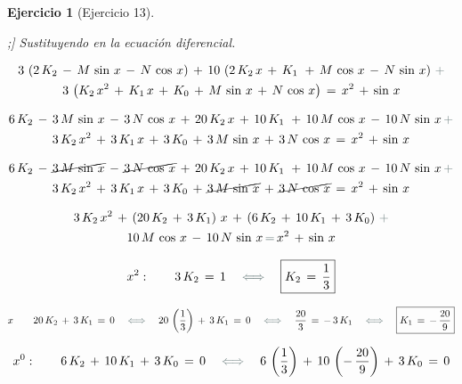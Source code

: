 \documentclass[a4paper,11pt, openany]{book}
\newtheorem{ejer}{Ejercicio}[section]
\newcommand*{\itembolasazules}[1]{%
\footnotesize\protect\tikz[baseline=-3pt]%
\protect\node[scale=.7, circle, shade, ball
color=green]{\color{white}\Large\bf#1};}
\begin{document}
\begin{ejer}[Ejercicio 13]
\begin{enumerate}[label=\itembolasazules{\arabic*}]
Sustituyendo en la ecuación diferencial.
 
\begin{multline*}
3\,\left(2\,K_{2}\,-\,M\,\sin\,x\,-\,N\,\cos\,x \right)\,+\,10\,\left(2\,K_{2}\,x\,+\,K_{1}\,\,+\,M\,\cos\,x\,-\,N\,\sin\,x \right)\,\textcolor{aurometalsaurus}{+} \\
3\,\left(K_{2}\,x^{2}\,+\,K_{1}\,x\,+\,K_{0}\,+\,M\,\sin\,x\,+\,N\,\cos\,x \right)\,=\,x^{2}\,+\,\sin\,x
\end{multline*}
 
\begin{multline*}
6\,K_{2}\,-\,3\,M\,\sin\,x\,-\,3\,N\,\cos\,x\,+\,20\,K_{2}\,x\,+\,10\,K_{1}\,\,+\,10\,M\,\cos\,x\,-\,10\,N\,\sin\,x\,\textcolor{aurometalsaurus}{+} \\
3\,K_{2}\,x^{2}\,+\,3\,K_{1}\,x\,+\,3\,K_{0}\,+\,3\,M\,\sin\,x\,+\,3\,N\,\cos\,x\,=\,x^{2}\,+\,\sin\,x
\end{multline*}
 
\begin{multline*}
6\,K_{2}\,-\,\cancel{3\,M\,\sin\,x}\,-\,\cancel{3\,N\,\cos\,x}\,+\,20\,K_{2}\,x\,+\,10\,K_{1}\,\,+\,10\,M\,\cos\,x\,-\,10\,N\,\sin\,x\,\textcolor{aurometalsaurus}{+} \\
3\,K_{2}\,x^{2}\,+\,3\,K_{1}\,x\,+\,3\,K_{0}\,+\,\cancel{3\,M\,\sin\,x}\,+\,\cancel{3\,N\,\cos\,x}\,=\,x^{2}\,+\,\sin\,x
\end{multline*}
 
 
\begin{multline*}
3\,K_{2}\,x^{2}\,+\,\left(20\,K_{2}\,+\,3\,K_{1} \right)\,x\,+\,\left(6\,K_{2}\,+\,10\,K_{1}\,+\,3\,K_{0} \right)\,\textcolor{aurometalsaurus}{+} \\   
10\,M\,\cos\,x\,-\,10\,N\,\sin\,x\,\textcolor{aurometalsaurus}{=}\,x^{2}\,+\,\sin\,x
\end{multline*}
 
$$x^{2}: \qquad 3\,K_{2}\,=\,1 \quad \textcolor{aurometalsaurus}{\iff} \quad \boxed{K_{2}\,=\,\dfrac{1}{3}}$$
 
$$x \qquad 20\,K_{2}\,+\,3\,K_{1}\,=\,0 \quad \textcolor{aurometalsaurus}{\iff} \quad 20\,\left(\dfrac{1}{3} \right)\,+\,3\,K_{1}\,=\,0 \quad \textcolor{aurometalsaurus}{\iff} \quad \dfrac{20}{3}\,=\,-\,3\,K_{1}\quad \textcolor{aurometalsaurus}{\iff} \quad \boxed{K_{1}\,=\,-\,\dfrac{20}{9} }$$
 
$$x^{0}: \qquad 6\,K_{2}\,+\,10\,K_{1}\,+\,3\,K_{0}\,=\,0 \quad \textcolor{aurometalsaurus}{\iff} \quad 6\,\left(\dfrac{1}{3} \right)\,+\,10\,\left(-\,\dfrac{20}{9} \right)\,+\,3\,K_{0}\,=\,0$$
 

\end{enumerate}
\end{ejer}
\end{document}

